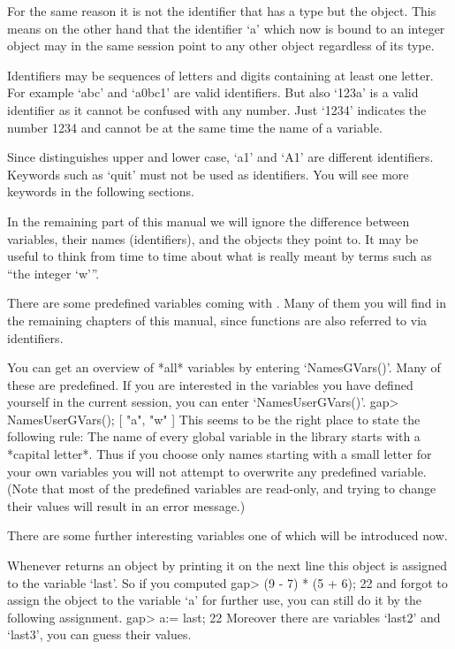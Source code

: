 For the  same reason it is  not the  identifier that has   a type but the
object.  This means  on the other hand that  the identifier `a' which now
is bound to an integer object may in the  same session point to any other
object regardless of its type.

Identifiers  may be sequences  of letters and digits containing at  least
one letter.   For example  `abc' and `a0bc1'  are valid identifiers.  But
also `123a'  is  a valid identifier as  it cannot be  confused  with  any
number.  Just `1234' indicates the  number 1234 and cannot be at the same
time the name of a variable.

Since  {\GAP} distinguishes  upper and  lower  case, `a1'  and  `A1'  are
different  identifiers.   Keywords  such as `quit'  must not  be used  as
identifiers.  You will see more keywords in the following sections.

In  the remaining  part of  this manual   we  will ignore the  difference
between variables, their names  (identifiers), and the objects they point
to.  It may be useful  to think from time  to  time about what is  really
meant by terms such as ``the integer `w'''.

There are some predefined variables coming with {\GAP}.  Many of them you
will find in the remaining  chapters of  this manual, since functions are
also referred to via identifiers.

You    can get   an  overview   of  *all*  {\GAP}   variables by entering
`NamesGVars()'.  Many of these are predefined.  If  you are interested in
the variables you  have defined yourself  in the current {\GAP}  session,
you can enter `NamesUserGVars()'.
\begintt
gap> NamesUserGVars();
[ "a", "w" ]
\endtt
This seems to be the  right place to state the  following rule:
The name of every global variable in the {\GAP} library starts with a
*capital letter*.
Thus if you choose only names starting with a small letter for your own
variables you will not attempt to overwrite any predefined variable.
(Note that most of the predefined variables are read-only,
and trying to change their values will result in an error message.)

There are some further interesting variables one of which will be
introduced now.

Whenever {\GAP} returns an object by printing it  on  the next  line this
object is assigned to the variable `last'.  So if you computed
\beginexample
gap> (9 - 7) * (5 + 6);
22
\endexample
and forgot to assign the object to the  variable `a' for further use, you
can still do it by the following assignment.
\beginexample
gap> a:= last;
22
\endexample
Moreover there are variables `last2' and `last3', you can guess their values.

